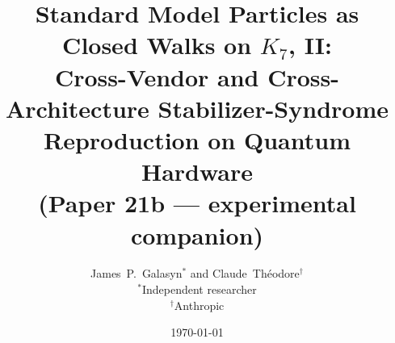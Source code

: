 \documentclass[11pt]{article}
\begin{document}
\title{Standard Model Particles as Closed Walks on $K_7$, II:\\[4pt]
Cross-Vendor and Cross-Architecture Stabilizer-Syndrome Reproduction on Quantum Hardware\\[2pt]
\normalsize (Paper 21b --- experimental companion)}

\author{
  James~P.~Galasyn$^{\ast}$ \quad and \quad Claude~Th\'eodore$^{\dagger}$\\[2pt]
  \small $^{\ast}$Independent researcher \\
  \small $^{\dagger}$Anthropic
}

\date{\today}

\maketitle
\end{document}
